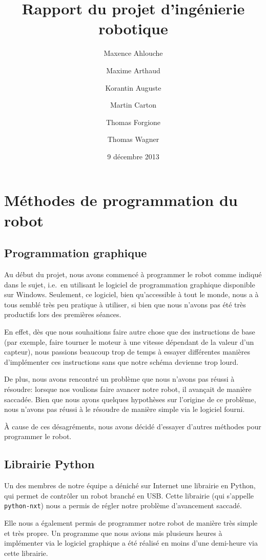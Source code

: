 \documentclass{scrartcl}
\author{Maxence Ahlouche \and Maxime Arthaud \and Korantin Auguste
  \and Martin Carton \and Thomas Forgione \and Thomas Wagner}
\title{Rapport du projet d'ingénierie robotique}
\date{9 décembre 2013}
\begin{document}
\maketitle
\tableofcontents
\newpage

\section{Méthodes de programmation du robot}
\subsection{Programmation graphique}

Au début du projet, nous avons commencé à programmer le robot comme
indiqué dans le sujet, i.e.\ en utilisant le logiciel de programmation
graphique disponible sur Windows. Seulement, ce logiciel, bien
qu'accessible à tout le monde, nous a à tous semblé très peu pratique
à utiliser, si bien que nous n'avons pas été très productifs lors des
premières séances.

En effet, dès que nous souhaitions faire autre
chose que des instructions de base (par exemple, faire tourner le
moteur à une vitesse dépendant de la valeur d'un capteur), nous
passions beaucoup trop de temps à essayer différentes manières
d'implémenter ces instructions sans que notre schéma devienne trop
lourd.

De plus, nous avons rencontré un problème que nous n'avons pas réussi
à résoudre: lorsque nos voulions faire avancer notre robot, il
avançait de manière saccadée. Bien que nous ayons quelques hypothèses
sur l'origine de ce problème, nous n'avons pas réussi à le résoudre de
manière simple via le logiciel fourni.

À cause de ces désagréments, nous avons décidé d'essayer
d'autres méthodes pour programmer le robot.

\subsection{Librairie Python}

Un des membres de notre équipe a déniché sur Internet une librairie en
Python, qui permet de contrôler un robot branché en USB. Cette
librairie (qui s'appelle \texttt{python-nxt}) nous a permis de régler
notre problème d'avancement saccadé.

Elle nous a également permis de programmer notre robot de manière très
simple et très propre. Un programme que nous avions mis plusieurs
heures à implémenter via le logiciel graphique a été réalisé en moins
d'une demi-heure via cette librairie.
\end{document}
